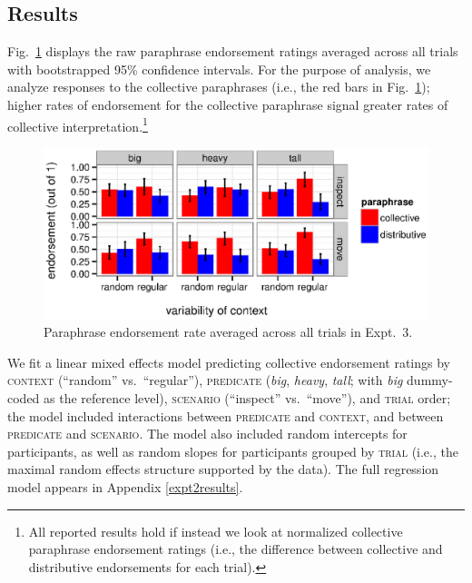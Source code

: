 \documentclass[linguex]{sp}
\begin{document}
\subsection{Results}

Fig.\ \ref{resultsexpt2} displays the raw paraphrase endorsement ratings averaged across all trials with bootstrapped 95\% confidence intervals. For the purpose of analysis, we analyze responses to the collective paraphrases (i.e., the red bars in Fig.~\ref{resultsexpt2}); higher rates of endorsement for the collective paraphrase signal greater rates of collective interpretation.\footnote{All reported results hold if instead we look at normalized collective paraphrase endorsement ratings (i.e., the difference between collective and distributive endorsements for each trial).} %

\begin{figure}[h!]
	\centering
	\includegraphics[width=\linewidth]{plots/expt2rawbootsci2.eps} 
	\vspace{-15pt}
	\caption{Paraphrase endorsement rate averaged across all trials in Expt.~3.}\label{resultsexpt2}
\end{figure}


We fit a linear mixed effects model predicting collective endorsement ratings by \textsc{context} (``random'' vs.~``regular''),
\textsc{predicate} (\emph{big}, \emph{heavy}, \emph{tall}; with \emph{big} dummy-coded as the reference level),
 \textsc{scenario} (``inspect'' vs.~``move''), and \textsc{trial} order; the model included interactions between \textsc{predicate} and \textsc{context}, and between \textsc{predicate} and \textsc{scenario}. The model also included random intercepts for participants, as well as random slopes for participants grouped by \textsc{trial} (i.e., the maximal random effects structure supported by the data). The full regression model appears in Appendix \ref{expt2results}.
\end{document}
